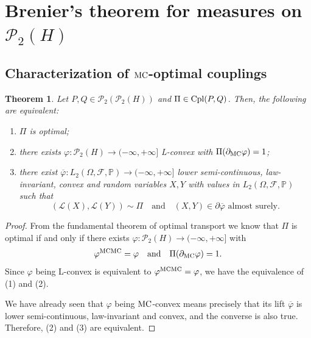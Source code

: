 \documentclass[a4paper]{amsart}
\newtheorem{theorem}{Theorem}
\numberwithin{theorem}{section}
\theoremstyle{definition}
\newcommand{\F}{\mathcal{F}}
\newcommand{\law}{\mathcal{L}}
\newcommand{\cpl}{\textup{Cpl}}
\newcommand{\Pc}{\mathcal P}
\renewcommand{\P}{\mathbb{P}}
\renewcommand{\H}{H}
\renewcommand{\phi}{\varphi}
\newcommand{\mc}{\textup{MC}}
\begin{document}
\section{Brenier's theorem for measures on $\Pc_2(\H)$}\label{sec:DensenessOfTransportReg}


\subsection{Characterization of $\mc$-optimal couplings}



\begin{theorem} \label{thm:char.optimal_cpls}
    Let $P,Q \in \Pc_2(\Pc_2(\H))$ and $\Pi \in \cpl(P,Q)$. Then, the following are equivalent:
    \begin{enumerate}
        \item $\Pi$ is optimal;
        \item there exists $\phi : \Pc_2(\H) \to (-\infty, + \infty]$ L-convex with $\Pi(\partial_\mc \phi) = 1$;
        \item there exist $\overline{\phi} : L_2(\Omega,\F,\P) \to (-\infty, + \infty]$ lower semi-continuous, law-invariant, convex and random variables $X,Y$ with values in $L_2(\Omega,\F,\P)$ such that
        \[
            (\law(X),\law(Y)) \sim \Pi \quad \text{and} \quad
            (X,Y) \in \partial \overline{\phi} \text{ almost surely.}
        \]
    \end{enumerate}
\end{theorem}

\begin{proof}
    From the fundamental theorem of optimal transport we know that $\Pi$ is optimal if and only if there exists $\phi : \Pc_2(\H) \to (-\infty,+\infty]$ with
    \[
        \phi^{\mc\mc} = \phi \quad \text{and} \quad \Pi(\partial_\mc \phi) = 1.
    \]
    Since $\phi$ being L-convex is equivalent to $\phi^{\mc\mc} = \phi$, we have the equivalence of (1) and (2).

    We have already seen that $\phi$ being $\mc$-convex means precisely that its lift $\overline{\phi}$ is lower semi-continuous, law-invariant and convex, and the converse is also true.
    Therefore, (2) and (3) are equivalent.
\end{proof}
\end{document}
